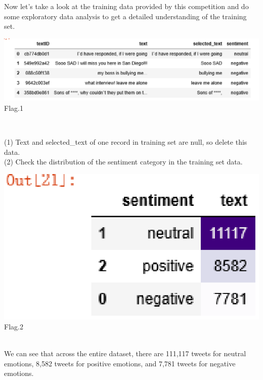 Now let's take a look at the training data provided by this competition 
and do some exploratory data analysis to get a detailed understanding of the training set.\\
\begin{center}
  \begin{minipage}{1.2\linewidth}
  \centering
  \includegraphics[width=1.2\textwidth]{kaggle/01.1.eps}
  {\small{Flag.1}}
  \end{minipage}
  \hfill
  \\
\end{center}
(1) Text and selected_text of one record in training set are null, 
so delete this data. \\
(2)
Check the distribution of the sentiment category in the training set data.
\begin{center}
  \begin{minipage}{1\linewidth}
    \centering
    \includegraphics[width=1\textwidth]{kaggle/01.3.eps}
    {\small{Flag.2}}
    \end{minipage}
  \hfill
  \\
  We can see that across the entire dataset, there are 111,117 tweets for 
  neutral emotions, 8,582 tweets for positive emotions, and 7,781 tweets
   for negative emotions.
   \\
   
\end{center}


